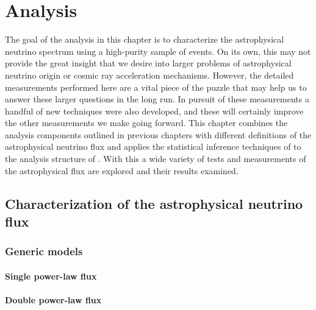 \chapter{Analysis}\label{chapter:analysis}

The goal of the analysis in this chapter is to characterize the astrophysical neutrino spectrum using a high-purity sample of events.
On its own, this may not provide the great insight that we desire into larger problems of astrophysical neutrino origin or cosmic ray acceleration mechanisms.
However, the detailed measurements performed here are a vital piece of the puzzle that may help us to answer these larger questions in the long run.
In pursuit of these measurements a handful of new techniques were also developed, and these will certainly improve the other measurements we make going forward.
This chapter combines the analysis components outlined in previous chapters with different definitions of the astrophysical neutrino flux and applies the statistical inference techniques of  to the analysis structure of .
With this a wide variety of tests and measurements of the astrophysical flux are explored and their results examined.

\section{Characterization of the astrophysical neutrino flux\label{sec:diffuse}}
\begingroup
\graphicspath{{results/HESE_Final_Paper/}}

\endgroup
\FloatBarrier

\subsection{Generic models\label{sec:generic_models}}
\begingroup
\graphicspath{{results/HESE_Final_Paper/}}

\endgroup
\FloatBarrier

\subsubsection{Single power-law flux\label{sec:spl}}
\begingroup
\graphicspath{{results/HESE_Final_Paper/}}

\endgroup
\FloatBarrier

\subsubsection{Double power-law flux\label{sec:dpl}}
\begingroup
\graphicspath{{results/HESE_Final_Paper/}}

\endgroup
\FloatBarrier

